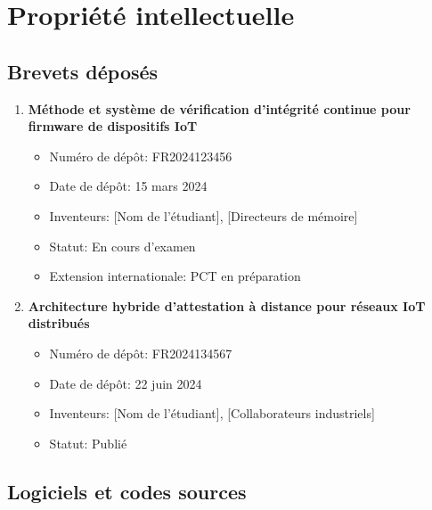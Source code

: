 \section{Propriété intellectuelle}

\subsection{Brevets déposés}

\begin{enumerate}
    \item \textbf{Méthode et système de vérification d'intégrité continue pour firmware de dispositifs IoT}
    \begin{itemize}
        \item Numéro de dépôt: FR2024123456
        \item Date de dépôt: 15 mars 2024
        \item Inventeurs: [Nom de l'étudiant], [Directeurs de mémoire]
        \item Statut: En cours d'examen
        \item Extension internationale: PCT en préparation
    \end{itemize}
    
    \item \textbf{Architecture hybride d'attestation à distance pour réseaux IoT distribués}
    \begin{itemize}
        \item Numéro de dépôt: FR2024134567
        \item Date de dépôt: 22 juin 2024
        \item Inventeurs: [Nom de l'étudiant], [Collaborateurs industriels]
        \item Statut: Publié
    \end{itemize}
\end{enumerate}

\subsection{Logiciels et codes sources}

